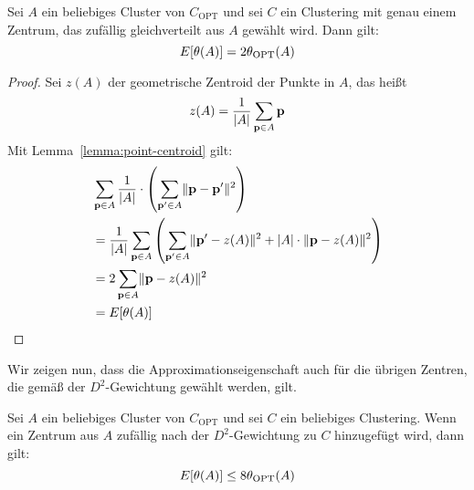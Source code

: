 \begin{lemma}
\label{lemma:kkmpp-first-center-approx}
	Sei $A$ ein beliebiges Cluster von $C_\textrm{OPT}$ und sei $C$ ein Clustering mit genau einem Zentrum, das zufällig
	gleichverteilt aus $A$ gewählt wird. Dann gilt:
	\[ E[\theta(A)] = 2 \theta_{\textrm{OPT}}(A) \]
\end{lemma}
\begin{proof}
	Sei $z(A)$ der geometrische Zentroid der Punkte in $A$, das heißt
	\[ z(A) = \frac{1}{\left|A\right|} \sum_{\mathbf{p} \in A} \mathbf{p} \]
	Mit Lemma~\ref{lemma:point-centroid} gilt:
	\begin{align*}
		& \sum_{\mathbf{p} \in A} \frac{1}{\left|A\right|} \cdot \left( \sum_{\mathbf{p}' \in A} \lVert {\ensuremath{\mathbf{p}}} - {\mathbf{p}'} \rVert^2 \right) \\
		&= \frac{1}{\left|A\right|} \sum_{\mathbf{p} \in A} \left( \sum_{\mathbf{p}' \in A} \lVert {\ensuremath{\mathbf{p}}'} - {z(A)} \rVert^2 
			+ \left|A\right| \cdot \lVert {\ensuremath{\mathbf{p}}} - {z(A)} \rVert^2 \right) \\
		&= 2 \sum_{\mathbf{p} \in A} \lVert {\ensuremath{\mathbf{p}}} - {z(A)} \rVert^2 \\
		&= E[\theta(A)]
	\end{align*}
\end{proof}
Wir zeigen nun, dass die Approximationseigenschaft auch für die übrigen Zentren, die gemäß der $D^2$-Gewichtung gewählt werden,
gilt.
\begin{lemma}
\label{lemma:kkmpp-remaining-center-approx}
	Sei $A$ ein beliebiges Cluster von $C_\textrm{OPT}$ und sei $C$ ein beliebiges Clustering. Wenn ein Zentrum aus $A$
	zufällig nach der $D^2$-Gewichtung zu $C$ hinzugefügt wird, dann gilt:
	\[ E[\theta(A)] \leq 8 \theta_{\textrm{OPT}}(A) \]
\end{lemma}
